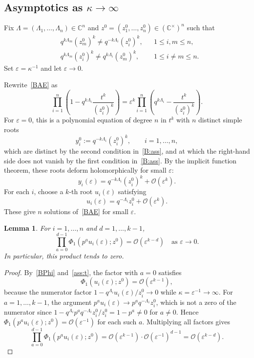 \documentclass[12pt]{amsart}
\newtheorem{lem}[thm]{Lemma}
\theoremstyle{definition} %
\numberwithin{equation}{section}
\theoremstyle{definition}
\let\mc\mathcal
\let\eps\varepsilon
\let\ka\kappa
\let\La\Lambda
\let\leq\leqslant
\def\C{{\mathbb C}}
\begin{document}
\subsection{Asymptotics as $\ka\to\infty$}

Fix $\La=(\La_1,\dots,\La_n)\in\C^n$ and
$z^0=(z_1^0,\dots,z_n^0)\in(\C^\times)^n$ such that
\begin{equation}
\label{B:ass}
\begin{aligned}
&q^{k\La_m}(z_m^0)^k \neq q^{-k\La_i}(z_i^0)^k,
&&1\leq i,m\leq n,\\
&q^{k\La_m}(z_i^0)^k \neq q^{k\La_i}(z_m^0)^k,
&&1\leq i\neq m\leq n.
\end{aligned}
\end{equation}
Set $\eps=\ka^{-1}$ and let $\eps\to 0$.

\smallskip

Rewrite~\eqref{BAE} as
\begin{equation}
\label{BAE1}
\prod_{i=1}^n\!
\left(1-q^{k\La_i}\frac{t^k}{(z_i^0)^k}\right)
=
\eps^k
\prod_{i=1}^n\!
\left(q^{k\La_i}-\frac{t^k}{(z_i^0)^k}\right).
\end{equation}
For $\eps=0$, this is a polynomial equation of degree $n$ in $t^k$
with $n$ distinct simple roots
\[
y_i^0:=q^{-k\La_i}(z_i^0)^k,\qquad i=1,\dots,n,
\]
which are distinct by the second condition in~\eqref{B:ass}, and at
which the right-hand side does not vanish by the first condition
in~\eqref{B:ass}. By the implicit function theorem, these roots deform
holomorphically for small $\eps$:
\[
y_i(\eps)
=
q^{-k\La_i}(z_i^0)^k+\mc O(\eps^k).
\]
For each $i$, choose a $k$-th root $u_i(\eps)$ satisfying
\begin{equation}
\label{ass:t}
u_i(\eps)=q^{-\La_i}z_i^0+\mc O(\eps^k).
\end{equation}
These give $n$ solutions of~\eqref{BAE} for small $\eps$.

\begin{lem}
\label{lem:B1}
For $i=1,\dots,n$ and $d=1,\dots,k-1$,
\[
\prod_{a=0}^{d-1}\Phi_1(p^a u_i(\eps);z^0)
=
\mc O(\eps^{k-d})
\quad\text{as }\eps\to0.
\]
In particular, this product tends to zero.
\end{lem}

\begin{proof}
By~\eqref{BPhi} and~\eqref{ass:t}, the factor with $a=0$ satisfies
\[
\Phi_1(u_i(\eps);z^0)=\mc O(\eps^{k-1}),
\]
because the numerator factor $1-q^{\La_i}u_i(\eps)/z_i^0\to0$
while $\ka=\eps^{-1}\to\infty$.
For $a=1,\dots,k-1$, the argument $p^a u_i(\eps)\to p^a
q^{-\La_i}z_i^0$, which is not a zero of the numerator since
$1-q^{\La_i}p^a q^{-\La_i}z_i^0/z_i^0=1-p^a\ne0$ for $a\ne0$.
Hence $\Phi_1(p^a u_i(\eps);z^0)=\mc O(\eps^{-1})$ for each such $a$.
Multiplying all factors  gives
\[
\prod_{a=0}^{d-1}\Phi_1(p^a u_i(\eps);z^0)
=
\mc O(\eps^{k-1})\cdot\mc O(\eps^{-1})^{d-1}
=
\mc O(\eps^{k-d}).
\]
\end{proof}
\end{document}
